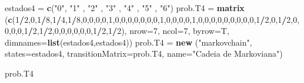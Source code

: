 \documentclass[
]{article}
\newenvironment{Shaded}{\begin{snugshade}}{\end{snugshade}}
\newcommand{\DataTypeTok}[1]{\textcolor[rgb]{0.13,0.29,0.53}{#1}}
\newcommand{\DecValTok}[1]{\textcolor[rgb]{0.00,0.00,0.81}{#1}}
\newcommand{\KeywordTok}[1]{\textcolor[rgb]{0.13,0.29,0.53}{\textbf{#1}}}
\newcommand{\NormalTok}[1]{#1}
\newcommand{\OperatorTok}[1]{\textcolor[rgb]{0.81,0.36,0.00}{\textbf{#1}}}
\newcommand{\StringTok}[1]{\textcolor[rgb]{0.31,0.60,0.02}{#1}}
\begin{document}
\begin{Shaded}
\begin{Highlighting}[]
\NormalTok{estados4 =}\StringTok{ }\KeywordTok{c}\NormalTok{(}\StringTok{"0"}\NormalTok{, }\StringTok{"1"}\NormalTok{ , }\StringTok{"2"}\NormalTok{ , }\StringTok{"3"}\NormalTok{ , }\StringTok{"4"}\NormalTok{ , }\StringTok{"5"}\NormalTok{ , }\StringTok{"6"}\NormalTok{)}
\NormalTok{prob.T4 =}\StringTok{ }\KeywordTok{matrix}\NormalTok{ (}\KeywordTok{c}\NormalTok{(}\DecValTok{1}\OperatorTok{/}\DecValTok{2}\NormalTok{,}\DecValTok{0}\NormalTok{,}\DecValTok{1}\OperatorTok{/}\DecValTok{8}\NormalTok{,}\DecValTok{1}\OperatorTok{/}\DecValTok{4}\NormalTok{,}\DecValTok{1}\OperatorTok{/}\DecValTok{8}\NormalTok{,}\DecValTok{0}\NormalTok{,}\DecValTok{0}\NormalTok{,}\DecValTok{0}\NormalTok{,}\DecValTok{0}\NormalTok{,}\DecValTok{1}\NormalTok{,}\DecValTok{0}\NormalTok{,}\DecValTok{0}\NormalTok{,}\DecValTok{0}\NormalTok{,}\DecValTok{0}\NormalTok{,}\DecValTok{0}\NormalTok{,}\DecValTok{0}\NormalTok{,}\DecValTok{0}\NormalTok{,}\DecValTok{1}\NormalTok{,}\DecValTok{0}\NormalTok{,}\DecValTok{0}\NormalTok{,}\DecValTok{0}\NormalTok{,}\DecValTok{0}\NormalTok{,}\DecValTok{1}\NormalTok{,}\DecValTok{0}\NormalTok{,}\DecValTok{0}\NormalTok{,}\DecValTok{0}\NormalTok{,}\DecValTok{0}\NormalTok{,}\DecValTok{0}\NormalTok{,}\DecValTok{0}\NormalTok{,}\DecValTok{0}\NormalTok{,}\DecValTok{0}\NormalTok{,}\DecValTok{0}\NormalTok{,}\DecValTok{1}\OperatorTok{/}\DecValTok{2}\NormalTok{,}\DecValTok{0}\NormalTok{,}\DecValTok{1}\OperatorTok{/}\DecValTok{2}\NormalTok{,}\DecValTok{0}\NormalTok{,}\DecValTok{0}\NormalTok{,}\DecValTok{0}\NormalTok{,}\DecValTok{0}\NormalTok{,}\DecValTok{1}\OperatorTok{/}\DecValTok{2}\NormalTok{,}\DecValTok{1}\OperatorTok{/}\DecValTok{2}\NormalTok{,}\DecValTok{0}\NormalTok{,}\DecValTok{0}\NormalTok{,}\DecValTok{0}\NormalTok{,}\DecValTok{0}\NormalTok{,}\DecValTok{0}\NormalTok{,}\DecValTok{0}\NormalTok{,}\DecValTok{1}\OperatorTok{/}\DecValTok{2}\NormalTok{,}\DecValTok{1}\OperatorTok{/}\DecValTok{2}\NormalTok{),}
                \DataTypeTok{nrow=}\DecValTok{7}\NormalTok{, }\DataTypeTok{ncol=}\DecValTok{7}\NormalTok{, }\DataTypeTok{byrow=}\NormalTok{T,}
                \DataTypeTok{dimnames=}\KeywordTok{list}\NormalTok{(estados4,estados4))}
\NormalTok{prob.T4 =}\StringTok{ }\KeywordTok{new}\NormalTok{ (}\StringTok{"markovchain"}\NormalTok{, }\DataTypeTok{states=}\NormalTok{estados4, }\DataTypeTok{transitionMatrix=}\NormalTok{prob.T4, }\DataTypeTok{name=}\StringTok{"Cadeia de Markoviana"}\NormalTok{)}

\NormalTok{prob.T4}
\end{Highlighting}
\end{Shaded}
\end{document}
